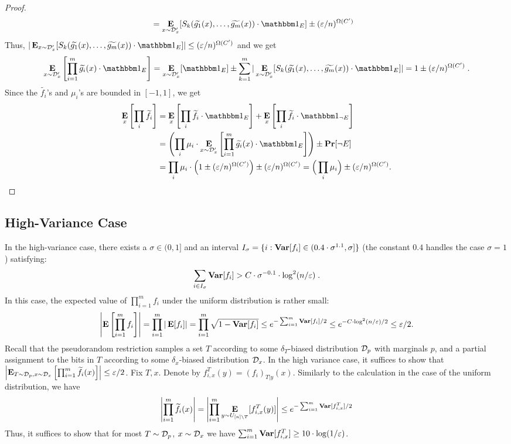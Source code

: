 \begin{proof}
\begin{align*}
&=\E_{x\sim \Dtagx}[S_{k}(\tilde{g_1}(x), \ldots, \tilde{g_m}(x)) \cdot \one_{E}] \pm (\eps/n)^{\Omega(C')}
\end{align*}
Thus, $|\E_{x\sim \Dtagx}[S_{k}(\tilde{g_1}(x), \ldots, \tilde{g_m}(x)) \cdot \one_{E}]| \le  (\eps/n)^{\Omega(C')}$ and we get 
$$
\E_{x\sim \Dtagx}\left[\prod_{i=1}^{m}\tilde{g_i}(x) \cdot \one_{E}\right] = \E_{x\sim \Dtagx}[\one_{E}] \pm  \sum_{k=1}^{m} |\E_{x\sim \Dtagx}[S_{k}(\tilde{g_1}(x), \ldots, \tilde{g_m}(x)) \cdot \one_{E}]| = 1 \pm (\eps/n)^{\Omega(C')}\;.$$
Since the $\tilde{f_i}$'s and $\mu_i$'s are bounded in $[-1,1]$, we get 
\begin{align*}
\E_{x}\left[ \prod_{i}\tilde{f_i}\right] &= 
\E_{x}\left[  \prod_{i}\tilde{f_i} \cdot \one_{E}\right] + \E_{x}\left[ \prod_{i}\tilde{f_i} \cdot \one_{ \neg E}\right]\\
&= \left(\prod_{i}{\mu_i} \cdot \E_{x\sim \Dtagx}\left[ \prod_{i=1}^{m} \tilde{g_i}(x) \cdot \one_{E}\right]\right)  \pm \Pr[\neg E] \\
&= \prod_{i}{\mu_i} \cdot \left(1\pm (\eps/n)^{\Omega(C')}\right)  \pm (\eps/n)^{\Omega(C')} =  \Big(\prod_{i}{\mu_i}\Big)   \pm (\eps/n)^{\Omega(C')}.\qedhere	
\end{align*}
\end{proof}

\subsection{High-Variance Case}

In the high-variance case, there exists a $\sigma \in (0,1]$ and an interval $I_\sigma = \{i: \mathop{\bf Var\/}[f_i]  \in (0.4\cdot\sigma^{1.1},\sigma]\}$ (the constant $0.4$ handles the case $\sigma=1$) satisfying:
$$
\sum_{i \in I_\sigma} \mathop{\bf Var\/}[f_i] > C\cdot \sigma^{-0.1}\cdot  \log^2(n/\varepsilon)\;.
$$
In this case, the expected value of $\prod_{i=1}^m{f_i}$ under the uniform distribution is rather small:
\begin{align*}
\left|\mathop{\bf E\/}\left[\prod_{i=1}^{m} f_i\right]\right|
 = \prod_{i=1}^{m} |\mathop{\bf E\/}[f_i]|
=  \prod_{i=1}^{m}{\sqrt{1-{\mathop{\bf Var\/}}[f_i]}}
\le e^{-\sum_{i=1}^{m}{{\mathop{\bf Var\/}}[f_i]/2}} \le e^{-C\cdot \log^2(n/\varepsilon)/2} \le \varepsilon/2.
\end{align*}
Recall that the pseudorandom restriction samples a set $T$ according to some $\delta_T$-biased distribution ${\mathcal{D}}_p$ with marginals $p$, and a partial assignment to the bits in $T$ according to some $\delta_x$-biased distribution ${\mathcal{D}_x}$. 
In the high variance case, it suffices to show that $\left|\mathop{\bf E\/}_{T\sim {\mathcal{D}}_p, x\sim {\mathcal{D}_x}}\left[\prod_{i=1}^{m}{\widetilde{f_i}(x)}\right]\right| \le \varepsilon/2$.
Fix $T, x$.  Denote by $f^T_{i,x}(y) = (f_{i})_{T|y}(x)$.
Similarly to the calculation in the  case of the uniform distribution, we have
\begin{align*}
\left|\prod_{i=1}^{m}{\widetilde{f_i}(x)}\right| = \left|\prod_{i=1}^{m}{\mathop{\bf E\/}_{y\sim U_{[n]\setminus T}}[f^T_{i,x}(y)]}\right|\le e^{-\sum_{i=1}^{m} {\mathop{\bf Var\/}}[f^T_{i,x}]/2}
\end{align*}
Thus, it suffices to show that for most $T\sim {\mathcal{D}}_p$, $x\sim {\mathcal{D}_x}$ we have $\sum_{i=1}^{m} {\mathop{\bf Var\/}}[f^T_{i,x}] \ge 10 \cdot \log(1/\varepsilon)$.

